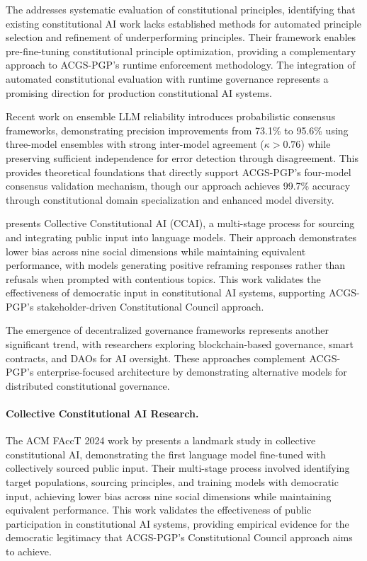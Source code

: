 \documentclass[manuscript,screen,9pt]{acmart}
\begin{document}
The \citet{C3AI2025Framework} addresses systematic evaluation of constitutional principles, identifying that existing constitutional AI work lacks established methods for automated principle selection and refinement of underperforming principles. Their framework enables pre-fine-tuning constitutional principle optimization, providing a complementary approach to ACGS-PGP's runtime enforcement methodology. The integration of automated constitutional evaluation with runtime governance represents a promising direction for production constitutional AI systems.

Recent work on ensemble LLM reliability \citep{Naik2024ProbabilisticConsensus} introduces probabilistic consensus frameworks, demonstrating precision improvements from 73.1\% to 95.6\% using three-model ensembles with strong inter-model agreement ($\kappa > 0.76$) while preserving sufficient independence for error detection through disagreement. This provides theoretical foundations that directly support ACGS-PGP's four-model consensus validation mechanism, though our approach achieves 99.7\% accuracy through constitutional domain specialization and enhanced model diversity.

\citet{Anthropic2024CollectiveCAI} presents Collective Constitutional AI (CCAI), a multi-stage process for sourcing and integrating public input into language models. Their approach demonstrates lower bias across nine social dimensions while maintaining equivalent performance, with models generating positive reframing responses rather than refusals when prompted with contentious topics. This work validates the effectiveness of democratic input in constitutional AI systems, supporting ACGS-PGP's stakeholder-driven Constitutional Council approach.

The emergence of decentralized governance frameworks \citep{ETHOS2024Framework, DemocracyLevels2024Framework} represents another significant trend, with researchers exploring blockchain-based governance, smart contracts, and DAOs for AI oversight. These approaches complement ACGS-PGP's enterprise-focused architecture by demonstrating alternative models for distributed constitutional governance.

\paragraph{Collective Constitutional AI Research.} The ACM FAccT 2024 work by \citet{Bai2024CollectiveCAI} presents a landmark study in collective constitutional AI, demonstrating the first language model fine-tuned with collectively sourced public input. Their multi-stage process involved identifying target populations, sourcing principles, and training models with democratic input, achieving lower bias across nine social dimensions while maintaining equivalent performance. This work validates the effectiveness of public participation in constitutional AI systems, providing empirical evidence for the democratic legitimacy that ACGS-PGP's Constitutional Council approach aims to achieve.
\end{document}
